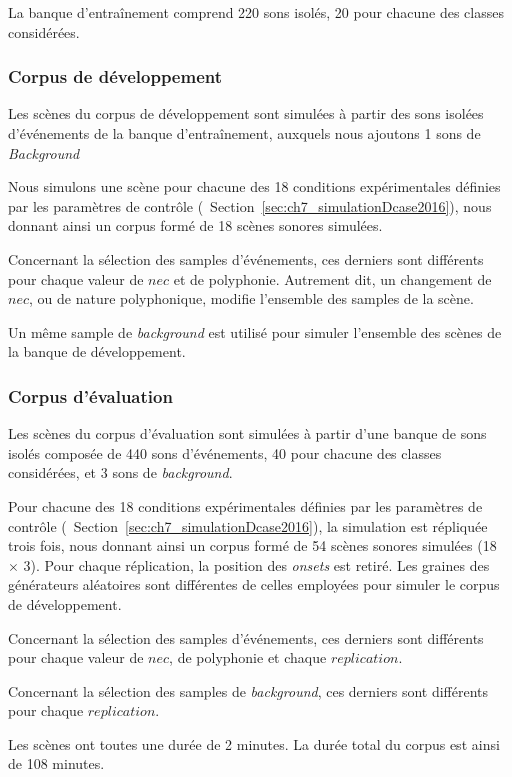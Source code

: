 La banque d’entraînement comprend 220 sons isolés, 20 pour chacune des classes considérées.

\subsubsection{Corpus de développement}

Les scènes du corpus de développement sont simulées à partir des sons isolées d'événements de la banque d’entraînement, auxquels nous ajoutons 1 sons de \emph{Background}

Nous simulons une scène pour chacune des 18 conditions expérimentales définies par les paramètres de contrôle (\cf~Section~\ref{sec:ch7_simulationDcase2016}), nous donnant ainsi un corpus formé de 18 scènes sonores simulées.

Concernant la sélection des samples d'événements, ces derniers sont différents pour chaque valeur de $nec$ et de polyphonie. Autrement dit, un changement de $nec$, ou de nature polyphonique, modifie l'ensemble des samples de la scène. 

Un même sample de \emph{background} est utilisé pour simuler l'ensemble des scènes de la banque de développement.

\subsubsection{Corpus d'évaluation}

Les scènes du corpus d'évaluation sont simulées à partir d'une banque de sons isolés composée de 440 sons d'événements, 40 pour chacune des classes considérées, et 3 sons de \emph{background}.

Pour chacune des 18 conditions expérimentales définies par les paramètres de contrôle (\cf~Section~\ref{sec:ch7_simulationDcase2016}), la simulation est répliquée trois fois, nous donnant ainsi un corpus formé de 54 scènes sonores simulées (18 $\times$ 3). Pour chaque réplication, la position des \emph{onsets} est retiré. Les graines des générateurs aléatoires sont différentes de celles employées pour simuler le corpus de développement.

Concernant la sélection des samples d'événements, ces derniers sont différents pour chaque valeur de $nec$, de polyphonie et chaque $replication$. 

Concernant la sélection des samples de \emph{background}, ces derniers sont différents pour chaque $replication$. 

Les scènes ont toutes une durée de 2 minutes. La durée total du corpus est ainsi de 108 minutes.

